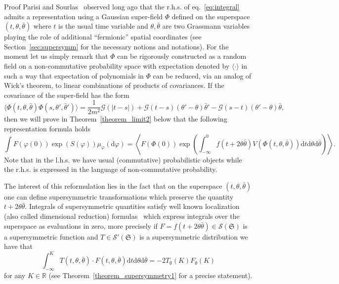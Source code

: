\documentclass[a4paper,10pt]{article}
\newcommand{\mathd}{\mathrm{d}}
\newenvironment{proof*}[1]{\noindent\textbf{#1\ }}{\hspace*{\fill}$\Box$\medskip}
\begin{document}
\begin{proof*}{Proof}
  Parisi and Sourlas~{\cite{parisi_supersymmetric_1982}} observed long ago
  that the r.h.s. of eq.~{\eqref{eq:integral}} admits a representation using a
  Gaussian super-field $\Phi$ defined on the superspace $(t, \theta,
  \bar{\theta})$ where $t$ is the usual time variable and $\theta,
  \bar{\theta}$ are two Grassmann variables playing the role of additional
  ``fermionic'' spatial coordinates (see Section~\ref{sec:supersymm} for the
  necessary notions and notations). For the moment let us simply remark that
  $\Phi$ can be rigorously constructed as a random field on a non-commutative
  probability space with expectation denoted by $\langle \cdot \rangle$ in
  such a way that expectation of polynomials in $\Phi$ can be reduced, via an
  analog of Wick's theorem, to linear combinations of products of covariances.
  If the covariance of the super-field has the form
  \begin{equation}
    \langle \Phi (t, \theta, \bar{\theta}) \Phi (s, \theta', \bar{\theta}')
    \rangle = \frac{1}{2 m^2} \mathcal{G} (| t - s |) + \mathcal{G} (t - s)
    (\theta' - \theta) \bar{\theta}' - \mathcal{G} (s - t) (\theta' - \theta)
    \bar{\theta} \label{eq:covariance1},
  \end{equation}
  then we will prove in Theorem~\ref{theorem_limit2} below that the following
  representation formula holds
  \begin{equation}
    \int F (\varphi (0)) \exp (S (\varphi)) \mu_{\varphi} (\mathd \varphi) =
    \left\langle F (\Phi (0)) \exp \left( \int_{- \infty}^0 f (t + 2 \theta
    \bar{\theta}) V (\Phi (t, \theta, \bar{\theta})) \mathd t \mathd \theta
    \mathd \bar{\theta} \right) \right\rangle . \label{eq:integral2}
  \end{equation}
  Note that in the l.h.s. we have usual (commutative) probabilistic objects
  while the r.h.s. is expressed in the language of non-commutative
  probability.
  
  The interest of this reformulation lies in the fact that on the superspace
  $(t, \theta, \bar{\theta})$ one can define supersymmetric transformations
  which preserve the quantity $t + 2 \theta \bar{\theta}$. Integrals of
  supersymmetric quantities satisfy well known localization (also called
  dimensional reduction)
  formulas~{\cite{brydges_branched_2003,helmuth_dimensional_2016,brydges_dimensional_2003,Klein1984,Zaboronsky1997}}
  which express integrals over the superspace as evaluations in zero, more
  precisely if $F = f (t + 2 \theta \bar{\theta}) \in \mathcal{S}
  (\mathfrak{S})$ is a supersymmetric function and $T \in \mathcal{S}'
  (\mathfrak{S})$ is a supersymmetric distribution we have that
  \[ \int_{- \infty}^K T (t, \theta, \bar{\theta}) \cdot F (t, \theta,
     \bar{\theta}) \mathd t \mathd \theta \mathd \bar{\theta} = - 2
     T_{\emptyset} (K) F_{\emptyset} (K) \]
  for any $K \in \mathbb{R}$ (see Theorem~\ref{theorem_supersymmetry1} for a
  precise statement).
  

\end{proof*}
\end{document}
